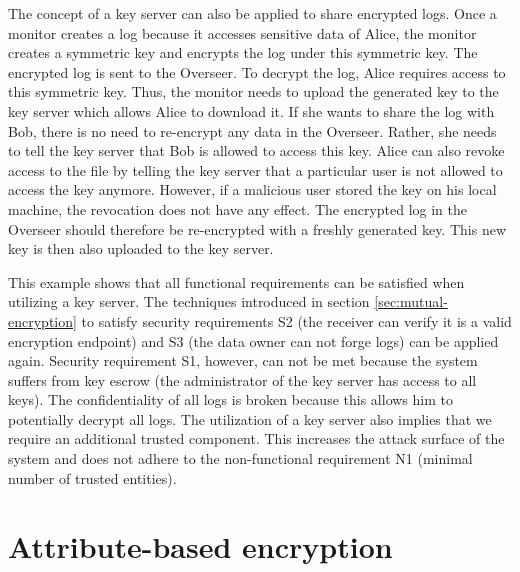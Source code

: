 \documentclass[../main.tex]{subfiles}
\begin{document}
The concept of a key server can also be applied to share encrypted logs.
Once a monitor creates a log because it accesses sensitive data of Alice, the monitor creates a symmetric key and encrypts the log under this symmetric key.
The encrypted log is sent to the Overseer.
To decrypt the log, Alice requires access to this symmetric key.
Thus, the monitor needs to upload the generated key to the key server which allows Alice to download it.
If she wants to share the log with Bob, there is no need to re-encrypt any data in the Overseer.
Rather, she needs to tell the key server that Bob is allowed to access this key.
Alice can also revoke access to the file by telling the key server that a particular user is not allowed to access the key anymore.
However, if a malicious user stored the key on his local machine, the revocation does not have any effect.
The encrypted log in the Overseer should therefore be re-encrypted with a freshly generated key.
This new key is then also uploaded to the key server.

This example shows that all functional requirements can be satisfied when utilizing a key server.
The techniques introduced in section \ref{sec:mutual-encryption} to satisfy security requirements S2 (the receiver can verify it is a valid encryption endpoint) and S3 (the data owner can not forge logs) can be applied again.
Security requirement S1, however, can not be met because the system suffers from key escrow (the administrator of the key server has access to all keys).
The confidentiality of all logs is broken because this allows him to potentially decrypt all logs.
The utilization of a key server also implies that we require an additional trusted component.
This increases the attack surface of the system and does not adhere to the non-functional requirement N1 (minimal number of trusted entities).

\section{Attribute-based encryption}
\end{document}

